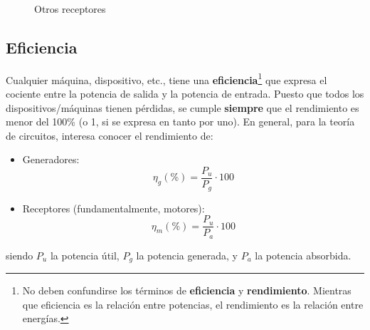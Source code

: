 \begin{itemize}
\begin{figure}[H]
            \caption{Otros receptores}
            \label{fig:receptores}
          \end{figure}
	\end{itemize}
	

	\subsection{Eficiencia}
	Cualquier máquina, dispositivo, etc., tiene una
        \textbf{eficiencia}\footnote{No deben confundirse los términos
          de \textbf{eficiencia} y \textbf{rendimiento}. Mientras que
          eficiencia es la relación entre potencias, el rendimiento es
          la relación entre energías.} %
	que expresa el cociente entre la potencia de salida y la
        potencia de entrada. Puesto que todos los
        dispositivos/máquinas tienen pérdidas, se cumple
        \textbf{siempre} que el rendimiento es menor del 100\% (o 1,
        si se expresa en tanto por uno). En general, para la teoría de
        circuitos, interesa conocer el rendimiento de:
	\begin{itemize}
        \item Generadores:
          \begin{equation}
            \boxed{\eta_g (\%) = \frac{P_{u}}{P_{g}}\cdot 100}
          \end{equation}
        \item Receptores (fundamentalmente, motores):
          \begin{equation}
            \boxed{\eta_m (\%) = \frac{P_{u}}{P_{a}}\cdot 100}
          \end{equation}
	\end{itemize}
        siendo $P_u$ la potencia útil, $P_g$ la potencia generada, y
        $P_a$ la potencia absorbida.
	
